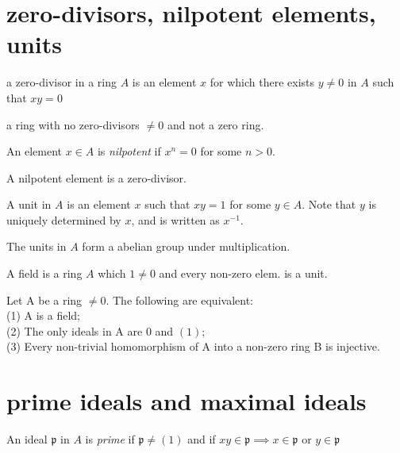 \documentclass[11pt,fleqn]{book} %
\begin{document}
\begin{CJK}{UTF8}{gkai}
\section{zero-divisors, nilpotent elements, units}
\begin{definition}
	 a zero-divisor in a ring $A$ is an element $x$ for which there exists $y \neq 0$ in $A$ such that $xy = 0$
\end{definition}
\begin{definition}
	 a ring with no zero-divisors $\neq 0$ and not a zero ring.
\end{definition}

\begin{definition}
	[nilpotent] An element $x \in A$ is {\it nilpotent} if $x^n = 0$ for some $n > 0$.
\end{definition}
\begin{remark}
	A nilpotent element is a zero-divisor.
\end{remark}

\begin{definition}
	 A unit in $A$ is an element $x$ such that $xy = 1$ for some $y \in A$. Note that $y$ is uniquely determined by $x$, and is written as $x^{-1}$. 
\end{definition}
\begin{remark}
	The units in $A$ form a abelian group under multiplication.
\end{remark}

\begin{definition}
	[field] A field is a ring $A$ which $1 \neq 0$ and every non-zero elem. is a unit.
\end{definition}

\begin{proposition}
Let A be a ring $\neq 0$. The following are equivalent:\\
(1) A is a field;\\
(2) The only ideals in A are ${0}$ and $(1)$; \\
(3) Every non-trivial homomorphism of A into a non-zero ring B is injective.	
\end{proposition}

\section{prime ideals and maximal ideals}
\newcommand{\fp}{\mathfrak{p}}
\newcommand{\fm}{$\mathfrak{m}$}
\begin{definition}
	An ideal $\fp$ in $A$ is {\it prime} if $\fp \neq (1)$ and if $xy \in \fp \implies x\in \fp$ or $y \in \mathfrak{p}$ 
\end{definition}


\end{CJK}
\end{document}
